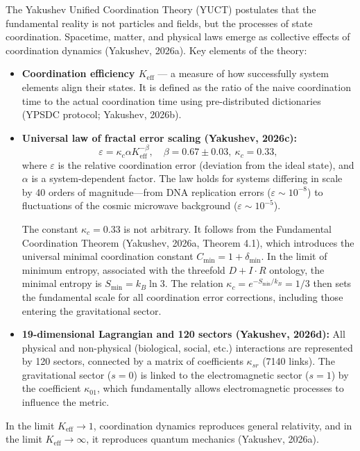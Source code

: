 \documentclass[12pt]{article}
\theoremstyle{remark}
\newcommand{\Keff}{K_{\mathrm{eff}}}
\newcommand{\eps}{\varepsilon}
\newcommand{\kappac}{\kappa_c}
\newcommand{\constmin}{C_{\min}}
\newcommand{\dint}{\ensuremath{D\!+\!I\!\cdot\!R}}
\begin{document}
	The Yakushev Unified Coordination Theory (YUCT) postulates that the fundamental reality is not particles and fields, but the processes of state coordination. Spacetime, matter, and physical laws emerge as collective effects of coordination dynamics (Yakushev, 2026a). Key elements of the theory:
	\begin{itemize}
		\item \textbf{Coordination efficiency $\Keff$} — a measure of how successfully system elements align their states. It is defined as the ratio of the naive coordination time to the actual coordination time using pre-distributed dictionaries (YPSDC protocol; Yakushev, 2026b).
		\item \textbf{Universal law of fractal error scaling (Yakushev, 2026c):}
		\begin{equation}
			\eps = \kappac \alpha \Keff^{-\beta}, \quad \beta = 0.67 \pm 0.03, \ \kappac = 0.33,
			\label{eq:universal-scaling}
		\end{equation}
		where $\eps$ is the relative coordination error (deviation from the ideal state), and $\alpha$ is a system-dependent factor. The law holds for systems differing in scale by 40 orders of magnitude—from DNA replication errors ($\eps\sim 10^{-8}$) to fluctuations of the cosmic microwave background ($\eps\sim 10^{-5}$).
		
		The constant $\kappac = 0.33$ is not arbitrary. It follows from the Fundamental Coordination Theorem (Yakushev, 2026a, Theorem 4.1), which introduces the universal minimal coordination constant $\constmin = 1 + \delta_{\min}$. In the limit of minimum entropy, associated with the threefold $\dint$ ontology, the minimal entropy is $S_{\min} = k_B \ln 3$. The relation $\kappac = e^{-S_{\min}/k_B} = 1/3$ then sets the fundamental scale for all coordination error corrections, including those entering the gravitational sector.
		
		\item \textbf{19-dimensional Lagrangian and 120 sectors (Yakushev, 2026d):} All physical and non-physical (biological, social, etc.) interactions are represented by 120 sectors, connected by a matrix of coefficients $\kappa_{sr}$ (7140 links). The gravitational sector ($s=0$) is linked to the electromagnetic sector ($s=1$) by the coefficient $\kappa_{01}$, which fundamentally allows electromagnetic processes to influence the metric.
	\end{itemize}
	In the limit $\Keff \to 1$, coordination dynamics reproduces general relativity, and in the limit $\Keff \to \infty$, it reproduces quantum mechanics (Yakushev, 2026a).
	
\end{document}
